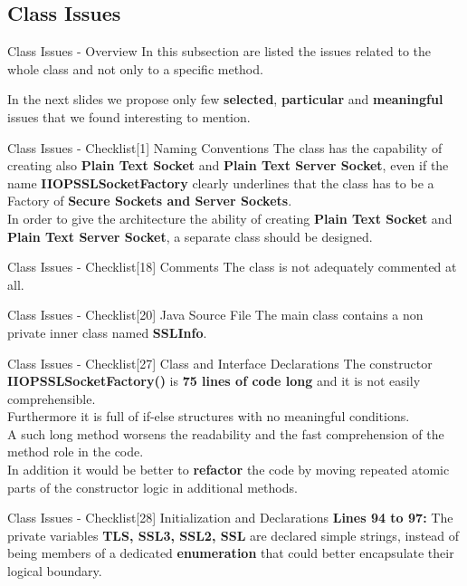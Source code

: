 \documentclass{../common/latex_classes/pdf_presentation}
\newcommand{\renderPartialCode}[2]{
	
}
\begin{document}
	\subsection{Class Issues}
	
	\begin{frame}{Class Issues - Overview}
		In this subsection are listed the issues related to the whole class and not only to a specific method. \par
		In the next slides we propose only few \textbf{selected}, \textbf{particular} and \textbf{meaningful} issues that we found interesting to mention.
	\end{frame}
	\begin{frame}{Class Issues - Checklist[1] Naming Conventions}
		The class has the capability of creating also \textbf{Plain Text Socket} and \textbf{Plain Text Server Socket}, even if the name \textbf{IIOPSSLSocketFactory} clearly underlines that the class has to be a Factory of \textbf{Secure Sockets and Server Sockets}. \\
		In order to give the architecture the ability of creating \textbf{Plain Text Socket} and \textbf{Plain Text Server Socket}, a separate class should be designed.
	\end{frame}
	\begin{frame}{Class Issues - Checklist[18] Comments}
		The class is not adequately commented at all.
	\end{frame}
	\begin{frame}{Class Issues - Checklist[20] Java Source File}
		The main class contains a non private inner class named \textbf{SSLInfo}.
	\end{frame}
	\begin{frame}{Class Issues - Checklist[27] Class and Interface Declarations}
		The constructor \textbf{IIOPSSLSocketFactory()} is \textbf{75 lines of code long} and it is not easily comprehensible.\\
		Furthermore it is full of if-else structures with no meaningful conditions.\\
		A such long method worsens the readability and the fast comprehension of the method role in the code.\\
		In addition it would be better to \textbf{refactor} the code by moving repeated atomic parts of the constructor logic in additional methods.
	\end{frame}
	\begin{frame}{Class Issues - Checklist[28] Initialization and Declarations}
		\textbf{Lines 94 to 97:} The private variables \textbf{TLS, SSL3, SSL2, SSL} are declared simple strings, instead of being members of a dedicated \textbf{enumeration} that could better encapsulate their logical boundary.
	\end{frame}
\end{document}
